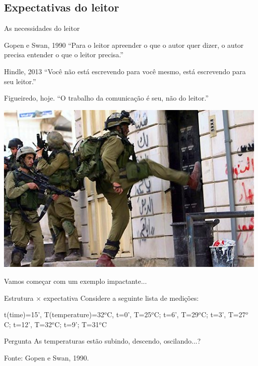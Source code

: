 \documentclass{beamer}
\begin{document}
\subsection{Expectativas do leitor}

\begin{frame}{As necessidades do leitor}
  \begin{block}{Gopen e Swan, 1990}
    ``Para o leitor apreender o que o autor quer dizer, o autor
    precisa entender o que o leitor precisa.''
  \end{block}
  \begin{block}{Hindle, 2013}
    ``Você não está escrevendo para você mesmo, está escrevendo para
    seu leitor.''
  \end{block}
  \begin{block}{Figueiredo, hoje.}
    ``O \alert{trabalho} da comunicação é seu, não do leitor.''
  \end{block}
\end{frame}

\begin{frame}
  \begin{center}
    \includegraphics[width=\textwidth]{Escrita/penaporta}
  \end{center}
  \bigskip
  Vamos começar com um exemplo impactante...
\end{frame}

\begin{frame}{Estrutura $\times$ expectativa}
  Considere a seguinte lista de medições:
  \begin{example}
    t(time)=15', T(temperature)=32$^o$C, t=0', T=25$^o$C; t=6',
    T=29$^o$C; t=3', T=27$^o$C; t=12', T=32$^o$C; t=9'; T=31$^o$C
  \end{example}

  \begin{block}{Pergunta}
    As temperaturas estão subindo, descendo, oscilando...?
  \end{block}
  \vfill
  Fonte: Gopen e Swan, 1990.
\end{frame}
\end{document}
